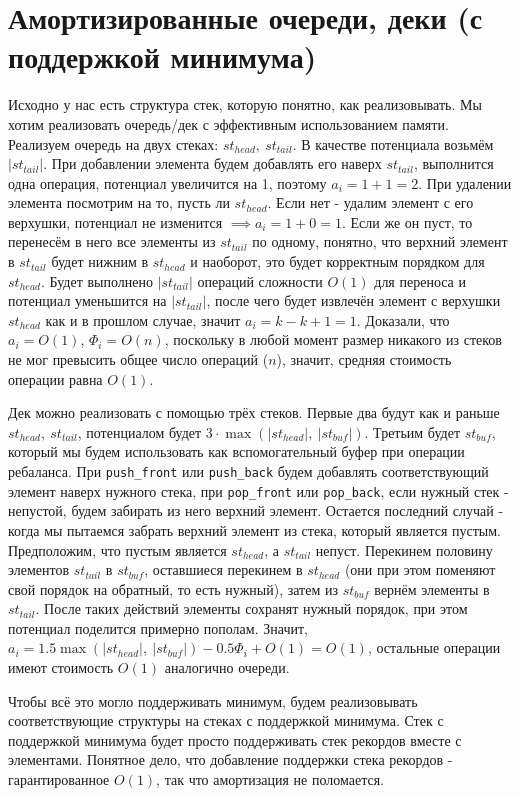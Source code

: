 \section{Амортизированные очереди, деки (с поддержкой минимума)}

Исходно у нас есть структура стек, которую понятно, как реализовывать. Мы хотим реализовать очередь/дек с эффективным использованием памяти. Реализуем очередь на двух стеках: $st_{head}, \ st_{tail}$. В качестве потенциала возьмём $|st_{tail}|$. При добавлении элемента будем добавлять его наверх $st_{tail}$, выполнится одна операция, потенциал увеличится на 1, поэтому $a_i = 1 + 1 = 2$. При удалении элемента посмотрим на то, пусть ли $st_{head}$. Если нет - удалим элемент с его верхушки, потенциал не изменится $\implies a_i = 1 + 0 = 1$. Если же он пуст, то перенесём в него все элементы из $st_{tail}$ по одному, понятно, что верхний элемент в $st_{tail}$ будет нижним в $st_{head}$ и наоборот, это будет корректным порядком для $st_{head}$. Будет выполнено $|st_{tail}|$ операций сложности $O(1)$ для переноса и потенциал уменьшится на $|st_{tail}|$, после чего будет извлечён элемент с верхушки $st_{head}$ как и в прошлом случае, значит $a_i = k - k + 1 = 1$. Доказали, что $a_i = O(1)$, $\Phi_i = O(n)$, поскольку в любой момент размер никакого из стеков не мог превысить общее число операций ($n$), значит, средняя стоимость операции равна $O(1)$.

Дек можно реализовать с помощью трёх стеков. Первые два будут как и раньше $st_{head}, \ st_{tail}$, потенциалом будет $3 \cdot \max(|st_{head}|, \ |st_{buf}|)$. Третьим будет $st_{buf}$, который мы будем использовать как вспомогательный буфер при операции ребаланса. При \texttt{push\_front} или \texttt{push\_back} будем добавлять соответствующий элемент наверх нужного стека, при \texttt{pop\_front} или \texttt{pop\_back}, если нужный стек - непустой, будем забирать из него верхний элемент. Остается последний случай - когда мы пытаемся забрать верхний элемент из стека, который является пустым. Предположим, что пустым является $st_{head}$, а $st_{tail}$ непуст. Перекинем половину элементов $st_{tail}$ в $st_{buf}$, оставшиеся перекинем в $st_{head}$ (они при этом поменяют свой порядок на обратный, то есть нужный), затем из $st_{buf}$ вернём элементы в $st_{tail}$. После таких действий элементы сохранят нужный порядок, при этом потенциал поделится примерно пополам. Значит, $a_i = 1.5 \max(|st_{head}|, \ |st_{buf}|) - 0.5\Phi_i + O(1) = O(1)$, остальные операции имеют стоимость $O(1)$ аналогично очереди.

Чтобы всё это могло поддерживать минимум, будем реализовывать соответствующие структуры на стеках с поддержкой минимума. Стек с поддержкой минимума будет просто поддерживать стек рекордов вместе с элементами. Понятное дело, что добавление поддержки стека рекордов - гарантированное $O(1)$, так что амортизация не поломается.

